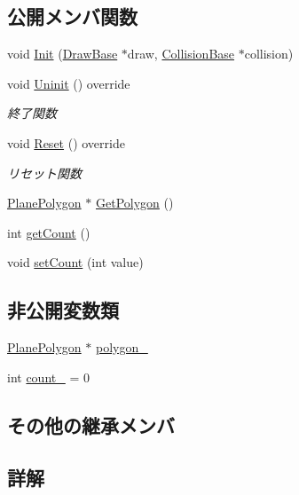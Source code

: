 \subsection*{公開メンバ関数}
\begin{DoxyCompactItemize}
\item 
void \mbox{\hyperlink{class_coin_aecb007762f15ecc91cd6a699e60c2e19}{Init}} (\mbox{\hyperlink{class_draw_base}{Draw\+Base}} $\ast$draw, \mbox{\hyperlink{class_collision_base}{Collision\+Base}} $\ast$collision)
\item 
void \mbox{\hyperlink{class_coin_a4d364dcb4b57b80ea00ce931d0bb300f}{Uninit}} () override
\begin{DoxyCompactList}\small\item\em 終了関数 \end{DoxyCompactList}\item 
void \mbox{\hyperlink{class_coin_a52c50229ce7c1e0f459e198adac70c8d}{Reset}} () override
\begin{DoxyCompactList}\small\item\em リセット関数 \end{DoxyCompactList}\item 
\mbox{\hyperlink{class_plane_polygon}{Plane\+Polygon}} $\ast$ \mbox{\hyperlink{class_coin_af435ca01cc92d7214e7bc94ed486ab7b}{Get\+Polygon}} ()
\item 
int \mbox{\hyperlink{class_coin_a5b302d3ad7be44267e1f4e6a54b0f23c}{get\+Count}} ()
\item 
void \mbox{\hyperlink{class_coin_acb3027a1a45470723b7952c73af69878}{set\+Count}} (int value)
\end{DoxyCompactItemize}
\subsection*{非公開変数類}
\begin{DoxyCompactItemize}
\item 
\mbox{\hyperlink{class_plane_polygon}{Plane\+Polygon}} $\ast$ \mbox{\hyperlink{class_coin_a30f920359d7dd4fa7b44f5135890c377}{polygon\+\_\+}}
\item 
int \mbox{\hyperlink{class_coin_aae793812faef50ec76f8293676150a9a}{count\+\_\+}} = 0
\end{DoxyCompactItemize}
\subsection*{その他の継承メンバ}


\subsection{詳解}


